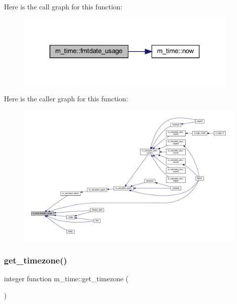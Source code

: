\begin{DoxyVerb}
Here is the call graph for this function\+:
\nopagebreak
\begin{figure}[H]
\begin{center}
\leavevmode
\includegraphics[width=307pt]{namespacem__time_a914927f70fb9495af1be2e484b967111_cgraph}
\end{center}
\end{figure}
Here is the caller graph for this function\+:
\nopagebreak
\begin{figure}[H]
\begin{center}
\leavevmode
\includegraphics[width=350pt]{namespacem__time_a914927f70fb9495af1be2e484b967111_icgraph}
\end{center}
\end{figure}
\mbox{\label{namespacem__time_a7903410a1d28bcdf3d33ab0c2d74b124}} 
\subsubsection{\texorpdfstring{get\+\_\+timezone()}{get\_timezone()}}
{\footnotesize\ttfamily integer function m\+\_\+time\+::get\+\_\+timezone (\begin{DoxyParamCaption}{ }\end{DoxyParamCaption})\hspace{0.3cm}{\ttfamily [private]}}


\end{DoxyVerb}
